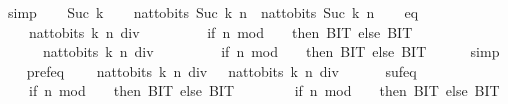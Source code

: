 \begin{isabellebody}
\ simp\isanewline
{}\isamarkupfalse%
\isanewline
\ \ \isamarkupfalse%
\ {\isacharparenleft}{\kern0pt}Suc\ k{\isacharparenright}{\kern0pt}\isanewline
\ \ \isamarkupfalse%
\ {\isacartoucheopen}nat{\isacharunderscore}{\kern0pt}to{\isacharunderscore}{\kern0pt}bits\ {\isacharparenleft}{\kern0pt}Suc\ k{\isacharparenright}{\kern0pt}\ n{}\ {\isacharequal}{\kern0pt}\ nat{\isacharunderscore}{\kern0pt}to{\isacharunderscore}{\kern0pt}bits\ {\isacharparenleft}{\kern0pt}Suc\ k{\isacharparenright}{\kern0pt}\ n{}{\isacartoucheclose}\isanewline
\ \ \isamarkupfalse%
\ eq{\isacharcolon}{\kern0pt}\isanewline
\ \ \ \ {\isachardoublequoteopen}nat{\isacharunderscore}{\kern0pt}to{\isacharunderscore}{\kern0pt}bits\ k\ {\isacharparenleft}{\kern0pt}n{}\ div\ {}{\isacharparenright}{\kern0pt}\isanewline
\ \ \ \ \ \ \ {\isacharat}{\kern0pt}\ {\isacharbrackleft}{\kern0pt}if\ n{}\ mod\ {}\ {\isacharequal}{\kern0pt}\ {}\ then\ BIT{}\ else\ BIT{}{\isacharbrackright}{\kern0pt}\isanewline
\ \ \ \ \ {\isacharequal}{\kern0pt}\ nat{\isacharunderscore}{\kern0pt}to{\isacharunderscore}{\kern0pt}bits\ k\ {\isacharparenleft}{\kern0pt}n{}\ div\ {}{\isacharparenright}{\kern0pt}\isanewline
\ \ \ \ \ \ \ {\isacharat}{\kern0pt}\ {\isacharbrackleft}{\kern0pt}if\ n{}\ mod\ {}\ {\isacharequal}{\kern0pt}\ {}\ then\ BIT{}\ else\ BIT{}{\isacharbrackright}{\kern0pt}{\isachardoublequoteclose}\isanewline
\ \ \ \ \isamarkupfalse%
\ simp\isanewline
\ \ \isamarkupfalse%
\ pref{\isacharunderscore}{\kern0pt}eq{\isacharcolon}{\kern0pt}\isanewline
\ \ \ \ {\isachardoublequoteopen}nat{\isacharunderscore}{\kern0pt}to{\isacharunderscore}{\kern0pt}bits\ k\ {\isacharparenleft}{\kern0pt}n{}\ div\ {}{\isacharparenright}{\kern0pt}\ {\isacharequal}{\kern0pt}\ nat{\isacharunderscore}{\kern0pt}to{\isacharunderscore}{\kern0pt}bits\ k\ {\isacharparenleft}{\kern0pt}n{}\ div\ {}{\isacharparenright}{\kern0pt}{\isachardoublequoteclose}\isanewline
\ \ \ \ \ suf{\isacharunderscore}{\kern0pt}eq{\isacharcolon}{\kern0pt}\isanewline
\ \ \ \ {\isachardoublequoteopen}{\isacharparenleft}{\kern0pt}if\ n{}\ mod\ {}\ {\isacharequal}{\kern0pt}\ {}\ then\ BIT{}\ else\ BIT{}{\isacharparenright}{\kern0pt}\isanewline
\ \ \ \ \ \ \ {\isacharequal}{\kern0pt}\ {\isacharparenleft}{\kern0pt}if\ n{}\ mod\ {}\ {\isacharequal}{\kern0pt}\ {}\ then\ BIT{}\ else\ BIT{}{\isacharparenright}{\kern0pt}{\isachardoublequoteclose}\isanewline

\end{isabellebody}

